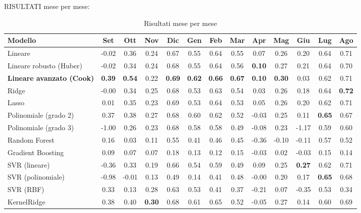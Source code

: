 RISULTATI mese per mese:

\begin{table}[H]
    \tiny
    \centering
    \setlength{\tabcolsep}{4pt}
    \def\arraystretch{1.5}
    \begin{tabular}{|l|c|c|c|c|c|c|c|c|c|c|c|c|}
    \hline
        \textbf{Modello} & \textbf{Set} & \textbf{Ott} & \textbf{Nov} & \textbf{Dic} & \textbf{Gen} & \textbf{Feb} & \textbf{Mar} & \textbf{Apr} & \textbf{Mag} & \textbf{Giu} & \textbf{Lug} & \textbf{Ago} \\ \hline
        Lineare & -0.02 & 0.36 & 0.24 & 0.67 & 0.55 & 0.64 & 0.55 & 0.07 & 0.26 & 0.20 & 0.64 & 0.71 \\ \hline
        Lineare robusto (Huber) & -0.02 & 0.34 & 0.24 & 0.68 & 0.55 & 0.64 & 0.56 & \textbf{0.10} & 0.27 & 0.21 & 0.64 & 0.70 \\ \hline
        \textbf{Lineare avanzato (Cook)} & \textbf{0.39} & \textbf{0.54} & 0.22 & \textbf{0.69} & \textbf{0.62} & \textbf{0.66} & \textbf{0.67} & \textbf{0.10} & \textbf{0.30} & 0.03 & 0.62 & 0.71 \\ \hline
        Ridge & -0.00 & 0.34 & 0.25 & 0.68 & 0.53 & 0.63 & 0.54 & 0.03 & 0.26 & 0.18 & 0.64 & \textbf{0.72} \\ \hline
        Lasso & 0.01 & 0.35 & 0.23 & 0.69 & 0.53 & 0.64 & 0.53 & 0.05 & 0.26 & 0.20 & 0.62 & 0.71 \\ \hline
        Polinomiale (grado 2) & 0.37 & 0.38 & 0.27 & 0.68 & 0.60 & 0.62 & 0.52 & -0.03 & 0.25 & 0.11 & \textbf{0.65} & 0.67 \\ \hline
        Polinomiale (grado 3) & -1.00 & 0.26 & 0.23 & 0.68 & 0.58 & 0.58 & 0.49 & -0.08 & 0.23 & -1.17 & 0.59 & 0.60 \\ \hline
        Random Forest & 0.16 & 0.03 & 0.11 & 0.55 & 0.41 & 0.46 & 0.45 & -0.36 & -0.10 & -0.11 & 0.57 & 0.52 \\ \hline
        Gradient Boosting & 0.09 & 0.07 & 0.07 & 0.18 & 0.13 & 0.12 & 0.15 & -0.03 & 0.02 & -0.03 & 0.15 & 0.14 \\ \hline
        SVR (lineare) & -0.36 & 0.33 & 0.19 & 0.66 & 0.54 & 0.59 & 0.49 & 0.09 & 0.25 & \textbf{0.27} & 0.62 & 0.71 \\ \hline
        SVR (polinomiale) & -0.98 & -0.01 & 0.13 & 0.49 & 0.14 & 0.41 & 0.48 & -0.00 & 0.20 & 0.17 & \textbf{0.65} & 0.68 \\ \hline
        SVR (RBF) & 0.33 & 0.13 & 0.28 & 0.63 & 0.53 & 0.41 & 0.37 & -0.21 & 0.07 & -0.35 & 0.53 & 0.34 \\ \hline
        KernelRidge & 0.38 & 0.40 & \textbf{0.30} & 0.68 & 0.61 & 0.65 & 0.52 & -0.05 & 0.27 & 0.14 & 0.60 & 0.69 \\ \hline
    \end{tabular}
    \caption{Risultati mese per mese}
    \label{fig:risultati-pm10-mese}
\end{table}

